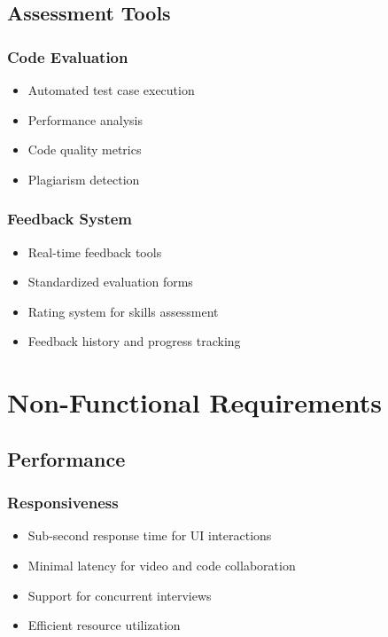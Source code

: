 \documentclass[12pt,a4paper]{report}
\begin{document}
\subsection{Assessment Tools}
\subsubsection{Code Evaluation}
\begin{itemize}
   \item Automated test case execution
   \item Performance analysis
   \item Code quality metrics
   \item Plagiarism detection
\end{itemize}

\subsubsection{Feedback System}
\begin{itemize}
   \item Real-time feedback tools
   \item Standardized evaluation forms
   \item Rating system for skills assessment
   \item Feedback history and progress tracking
\end{itemize}

\section{Non-Functional Requirements}

\subsection{Performance}
\subsubsection{Responsiveness}
\begin{itemize}
   \item Sub-second response time for UI interactions
   \item Minimal latency for video and code collaboration
   \item Support for concurrent interviews
   \item Efficient resource utilization
\end{itemize}
\end{document}
